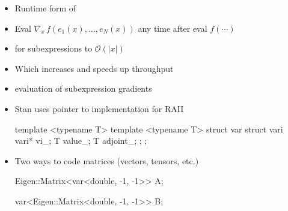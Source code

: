 \documentclass[9pt]{report}
\begin{document}
\begin{itemize}
\item Runtime form of 
\item Eval $\nabla_{x} \, f(e_1(x), \ldots, e_N(x))$ any time after
  eval $f(\cdots)$
\item {} for subexpressions to $\mathcal{O}(|x|)$
\item Which increases  and speeds up throughput
\item {} evaluation of subexpression gradients
\end{itemize}

\begin{itemize}
  \item Stan uses pointer to implementation for RAII
\begin{stancode}
template <typename T>   template <typename T>
struct var {            struct vari {
  vari* vi_;              T value_;  T adjoint_;
};                      };
\end{stancode}
%
\item Two ways to code matrices (vectors, tensors, etc.)
\begin{stancode}
Eigen::Matrix<var<double, -1, -1>> A;
\end{stancode}
\begin{stancode}
var<Eigen::Matrix<double, -1, -1>> B;
\end{stancode}
\end{itemize}
\end{document}
